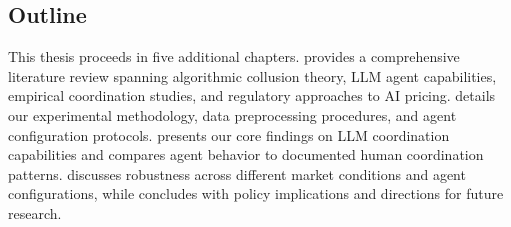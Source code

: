\subsection{Outline}

This thesis proceeds in five additional chapters.  provides a comprehensive literature review spanning algorithmic collusion theory, LLM agent capabilities, empirical coordination studies, and regulatory approaches to AI pricing.  details our experimental methodology, data preprocessing procedures, and agent configuration protocols.  presents our core findings on LLM coordination capabilities and compares agent behavior to documented human coordination patterns.  discusses robustness across different market conditions and agent configurations, while  concludes with policy implications and directions for future research.

